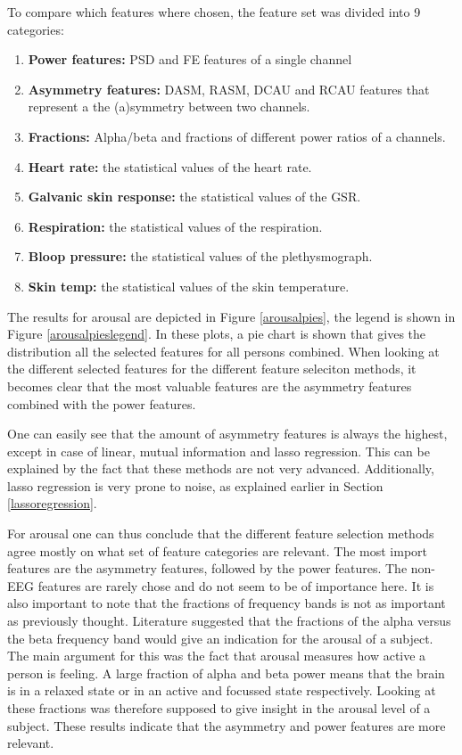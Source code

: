To compare which features where chosen, the feature set was divided into 9 categories:
\begin{enumerate}
\item \textbf{Power features:} PSD and FE features of a single channel
\item \textbf{Asymmetry features:} DASM, RASM, DCAU and RCAU features that represent a the (a)symmetry between two channels.
\item \textbf{Fractions:} Alpha/beta and fractions of different power ratios of a channels.

\item \textbf{Heart rate:} the statistical values of the heart rate.
\item \textbf{Galvanic skin response:} the statistical values of the GSR.
\item \textbf{Respiration:} the statistical values of the respiration.
\item \textbf{Bloop pressure:} the statistical values of the plethysmograph.
\item \textbf{Skin temp:} the statistical values of the skin temperature.
\end{enumerate} 

The results for arousal are depicted in Figure \ref{arousalpies}, the legend is shown in Figure \ref{arousalpieslegend}. In these plots, a pie chart is shown that gives the distribution all the selected features for all persons combined. When looking at the different selected features for the different feature seleciton methods, it becomes clear that the most valuable features are the asymmetry features combined with the power features.

\npar

One can easily see that the amount of asymmetry features is always the highest, except in case of linear, mutual information and lasso regression. This can be explained by the fact that these methods are not very advanced. Additionally, lasso regression is very prone to noise, as explained earlier in Section \ref{lassoregression}. 

\npar

For arousal one can thus conclude that the different feature selection methods agree mostly on what set of feature categories are relevant. The most import features are the asymmetry features, followed by the power features. The non-EEG features are rarely chose and do not seem to be of importance here. It is also important to note that the fractions of frequency bands is not as important as previously thought. Literature suggested that the fractions of the alpha versus the beta frequency band would give an indication for the arousal of a subject. The main argument for this was the fact that arousal measures how active a person is feeling. A large fraction of alpha and beta power means that the brain is in a relaxed state or in an active and focussed state respectively. Looking at these fractions was therefore supposed to give insight in the arousal level of a subject. These results indicate that the asymmetry and power features are more relevant.

